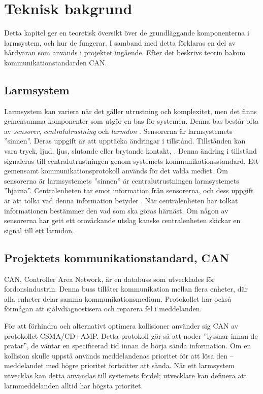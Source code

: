 

\section{Teknisk bakgrund}
Detta kapitel ger en teoretisk översikt över de grundläggande komponenterna i larmsystem, och hur de fungerar. I samband med detta förklaras en del av hårdvaran som används i projektet ingående. Efter det beskrivs teorin bakom kommunikationstandarden CAN. 
\label{sec:tekniskbakgrund}
\subsection{Larmsystem}
Larmsystem kan variera när det gäller utrustning och komplexitet, men det finns gemensamma komponenter som utgör en bas för systemen. Denna bas består ofta av \textit{sensorer}, \textit{centralutrustning} och \textit{larmdon} \cite[s. 15]{lundh:2008}.  
Sensorerna är larmsystemets ''sinnen''. Deras uppgift är att upptäcka ändringar i tillstånd. Tillstånden kan vara tryck, ljud, ljus, slutande eller brytande kontakt, \cite[s. 15]{lundh:2008}. 
Denna ändring i tillstånd signaleras till centralutrustningen genom systemets kommunikationsstandard. Ett gemensamt kommunikationsprotokoll används för det valda mediet. \newline \newline 
Om sensorerna är larmsystemets ''sinnen'' är centralutrustningen larmsystemets ''hjärna''. Centralenheten tar emot information från sensorerna, och dess uppgift är att tolka vad denna information betyder \cite[s. 18]{lundh:2008}. När centralenheten har tolkat informationen bestämmer den vad som ska göras härnäst. Om någon av sensorerna har gett ett oroväckande utslag kanske centralenheten skickar en signal till ett larmdon. 

\subsection{Projektets kommunikationstandard, CAN}
\label{sec:can}
CAN, Controller Area Network, är en databuss som utvecklades för fordonsindustrin. Denna buss tillåter kommunikation mellan flera enheter, där alla enheter delar samma kommunikationsmedium. Protokollet har också förmågan att självdiagnostisera och reparera fel i meddelanden. \begin{flushright}
\cite[s. 2]{corrigan:2016}
\end{flushright} 
För att förhindra och alternativt optimera kollisioner använder sig CAN av protokollet CSMA/CD+AMP. Detta protokoll gör så att noder ''lyssnar innan de pratar'', de väntar en specificerad tid innan de börja sända information. Om en kollision skulle uppstå används meddelandenas prioritet för att lösa den – meddelandet med högre prioritet fortsätter att sända. När ett larmsystem utvecklas kan detta användas till systemets fördel; utvecklare kan definera att larmmeddelanden alltid har högsta prioritet. \begin{flushright}
\cite[s. 3]{corrigan:2016}
\end{flushright} 

